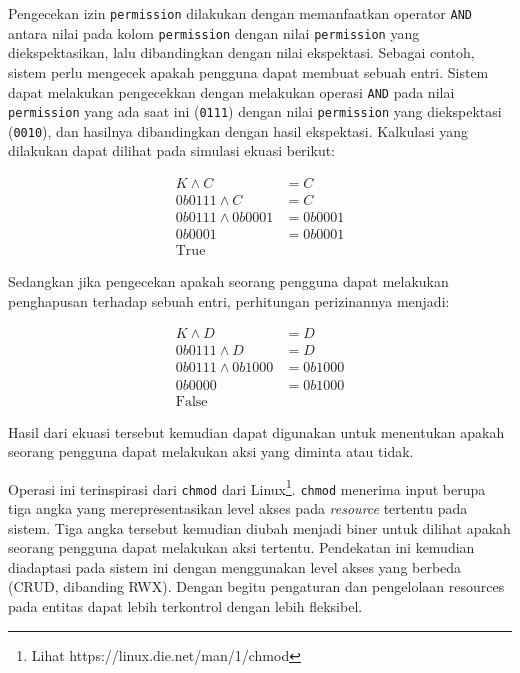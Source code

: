     Pengecekan izin \texttt{permission} dilakukan dengan memanfaatkan operator
    \texttt{AND} antara nilai pada kolom \texttt{permission} dengan nilai
    \texttt{permission} yang diekspektasikan, lalu dibandingkan dengan nilai
    ekspektasi. Sebagai contoh, sistem perlu mengecek apakah pengguna dapat
    membuat sebuah entri. Sistem dapat melakukan pengecekkan dengan melakukan
    operasi \texttt{AND} pada nilai \texttt{permission} yang ada saat ini
    (\texttt{0111}) dengan nilai \texttt{permission} yang diekspektasi
    (\texttt{0010}), dan hasilnya dibandingkan dengan hasil ekspektasi.
    Kalkulasi yang dilakukan dapat dilihat pada simulasi ekuasi berikut:
    
    \begin{subequations}
        \begin{align}
            K \wedge C &= C \\
            0b0111 \wedge C &= C \\
            0b0111 \wedge 0b0001 &= 0b0001 \\
            0b0001 &= 0b0001 \\
            \text{True}
        \end{align}
    \end{subequations}
    
    Sedangkan jika pengecekan apakah seorang pengguna dapat melakukan
    penghapusan terhadap sebuah entri, perhitungan perizinannya menjadi:
    
    \begin{subequations}
        \begin{align}
            K \wedge D &= D \\
            0b0111 \wedge D &= D \\
            0b0111 \wedge 0b1000 &= 0b1000 \\
            0b0000 &= 0b1000 \\
            \text{False}
        \end{align}
    \end{subequations}
    
    Hasil dari ekuasi tersebut kemudian dapat digunakan untuk menentukan apakah
    seorang pengguna dapat melakukan aksi yang diminta atau tidak.
    
    Operasi ini terinspirasi dari \texttt{chmod} dari Linux\footnote{Lihat
    https://linux.die.net/man/1/chmod}. \texttt{chmod} menerima input berupa
    tiga angka yang merepresentasikan level akses pada \textit{resource}
    tertentu pada sistem. Tiga angka tersebut kemudian diubah menjadi biner
    untuk dilihat apakah seorang pengguna dapat melakukan aksi tertentu.
    Pendekatan ini kemudian diadaptasi pada sistem ini dengan menggunakan level
    akses yang berbeda (CRUD, dibanding RWX). Dengan begitu pengaturan dan
    pengelolaan resources pada entitas dapat lebih terkontrol dengan lebih
    fleksibel.
    
